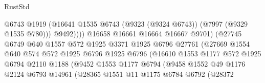 \begin{lexlean}{RustStd}
\begin{coremodule}
                                          @6743
                                          @1919
                                          (@16641
                                            @1535
                                            @6743
                                            (@9323 (@9324 @6743))
                                            (@7997 (@9329 @1535 @780)))
                                          @9492))))
                                  @16658
                                  @16661
                                  @16664
                                  @16667
                                  @9701)
                                (@27745
                                  @6749
                                  @640
                                  @1557
                                  @572
                                  @1925
                                  @3371
                                  @1925
                                  @6796
                                  @27761
                                  (@27669
                                    @1554
                                    @640
                                    @574
                                    @572
                                    @1925
                                    @6796
                                    @1925
                                    @6796
                                    (@16610
                                      @1553
                                      @1177
                                      @572
                                      @1925
                                      @6794
                                      @2110
                                      @1188
                                      (@9452
                                        @1553
                                        @1177
                                        @6794
                                        (@9458
                                          @1552
                                          @49
                                          @1176
                                          @2124
                                          @6793
                                          @14961
                                          (@28365
                                            @1551
                                            @11
                                            @1175
                                            @6784
                                            @6792
                                            (@28372

\end{coremodule}
\end{lexlean}
